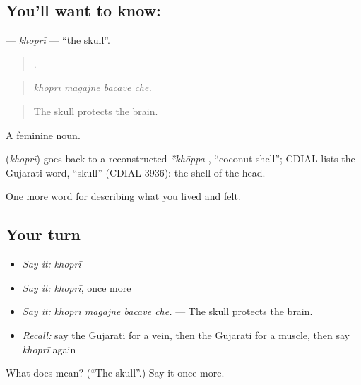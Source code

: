 \subsection*{You'll want to know: }
\textbf{} — \emph{khoprī} — \textquotedblleft{}the skull\textquotedblright{}.

\begin{quote}
   .
\end{quote}

\begin{quote}
\emph{khoprī magajne bacāve che.}
\end{quote}

\begin{quote}
The skull protects the brain.
\end{quote}

A feminine noun.

\begin{cousinweb}
\textbf{} (\emph{khoprī}) goes back to a reconstructed \emph{*khōppa-}, \textquotedblleft{}coconut shell\textquotedblright{}; CDIAL lists the Gujarati word, \textquotedblleft{}skull\textquotedblright{} (CDIAL 3936): the shell of the head.
\end{cousinweb}

\begin{grammarlens}[title={What you've built}]
One more word for describing what you lived and felt.
\end{grammarlens}

\subsection*{Your turn}
\begin{itemize}
\raggedright
  \item \emph{Say it:} \emph{khoprī}
  \item \emph{Say it:} \emph{khoprī}, once more
  \item \emph{Say it:} \emph{khoprī magajne bacāve che.} — The skull protects the brain.
  \item \emph{Recall:} say the Gujarati for a vein, then the Gujarati for a muscle, then say \emph{khoprī} again
\end{itemize}

\begin{tcolorbox}[breakable,colback=teal!4,colframe=teal!35!black,title={Before you move on}]
What does  mean? (\textquotedblleft{}The skull\textquotedblright{}.) Say it once more.
\end{tcolorbox}
